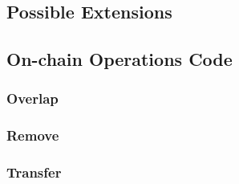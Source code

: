 \documentclass{article}
\theoremstyle{definition}
\begin{document}
\subsection{Possible Extensions}

\subsection{On-chain Operations Code}
\subsubsection{Overlap}
\begin{minipage}{\linewidth} %
  
\end{minipage}

\subsubsection{Remove}
\begin{minipage}{\linewidth} %
  
\end{minipage}

\subsubsection{Transfer}
\begin{minipage}{\linewidth} %
  
\end{minipage}
\end{document}
